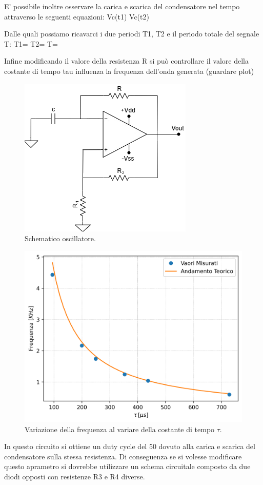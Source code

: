 \documentclass[a4paper,12pt]{article}
\begin{document}
E' possibile inoltre osservare la carica e scarica del condensatore nel tempo attraverso le seguenti equazioni:
Vc(t1)
Vc(t2)

Dalle quali possiamo ricavarci i due periodi T1, T2 e il periodo totale del segnale T:
T1=
T2=
T=

Infine modificando il valore della resistenza R si può controllare il valore della costante di tempo tau influenza la frequenza dell'onda generata (guardare plot) 

\begin{figure}[h]
    \centering
    \includegraphics[width=0.4\linewidth]{immagini/ocillatore/circuito.png}
    \caption{Schematico oscillatore.}
    \label{fig:schematico_oscillatore}
\end{figure}

\begin{figure}[h]
    \centering
    \includegraphics[width=0.6\linewidth]{immagini/ocillatore/freq_tau.png}
    \caption{Variazione della frequenza al variare della costante di tempo $\tau$.}
    \label{fig:ocillatore_freq_tau}
\end{figure}

In questo circuito si ottiene un duty cycle del 50 dovuto alla carica e scarica del condensatore sulla stessa resistenza. Di conseguenza se si volesse modificare questo aprametro si dovrebbe utilizzare un schema circuitale composto da due diodi opposti con resistenze R3 e R4 diverse.
\end{document}

